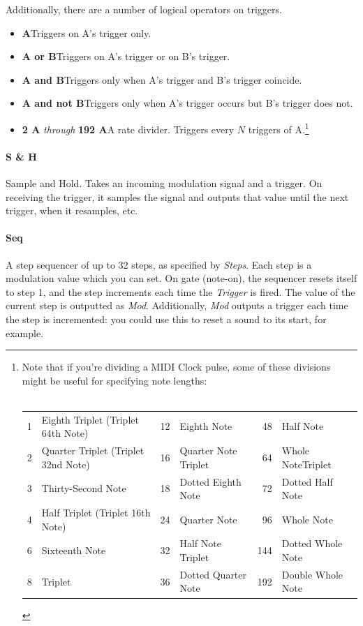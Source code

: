 \documentclass{article}
\begin{document}
\noindent Additionally, there are a number of logical operators on triggers.

\begin{itemize}
\item {\bf A}\quad Triggers on A's trigger only.
\item {\bf A or B}\quad Triggers on A's trigger or on B's trigger.
\item {\bf A and B}\quad Triggers only when A's trigger and B's trigger coincide.
\item {\bf A and not B}\quad Triggers only when A's trigger occurs but B's trigger does not.
\item {\bf 2 A} {\it through} {\bf 192 A}\quad A rate divider.  Triggers every \(N\) triggers of A.\footnote{Note that if you're dividing a MIDI Clock pulse, some of these divisions might be useful for specifying note lengths:\\
\\
\begin{tabular}{rlrlrl}
	1&	Eighth Triplet (Triplet 64th Note)	&12&	Eighth Note							&48&	Half Note		\\
	2&	Quarter Triplet (Triplet 32nd Note)	&16&	Quarter Note Triplet					&64&	Whole NoteTriplet\\
	3&	Thirty-Second Note				&18&	Dotted Eighth Note				&72&	Dotted Half Note\\
	4&	Half Triplet (Triplet 16th Note)		&24&	Quarter Note				&96&	Whole Note\\
	6&	Sixteenth Note					&32&	Half Note Triplet				&144&	Dotted Whole Note\\
	8&	Triplet								&36&	Dotted Quarter Note									&192&	Double Whole Note\\
\end{tabular}\vspace{1em}
}

\end{itemize}

\paragraph{S \& H}  Sample and Hold.  Takes an incoming modulation signal and a trigger.  On receiving the trigger, it samples the signal and outputs that value until the next trigger, when it resamples, etc.

\paragraph{Seq}  A step sequencer of up to 32 steps, as specified by {\it Steps}.  Each step is a modulation value which you can set.  On gate (note-on), the sequencer resets itself to step 1, and the step increments each time the {\it Trigger} is fired.  The value of the current step is outputted as {\it Mod}.  Additionally, {\it Mod} outputs a trigger each time the step is incremented: you could use this to reset a sound to its start, for example. 
\end{document}
